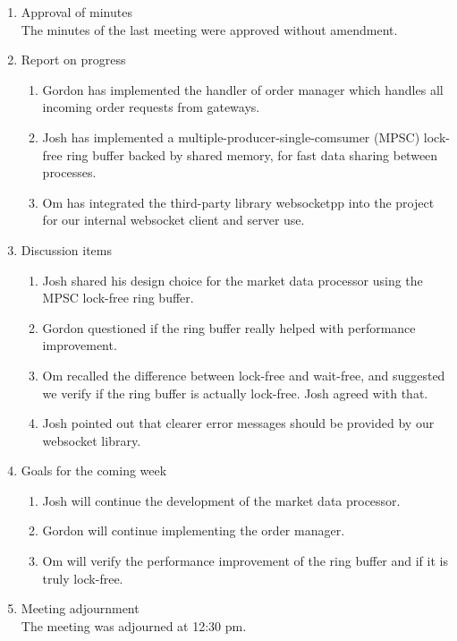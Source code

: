 \documentclass[12pt,a4paper]{article}
\begin{document}
\begin{enumerate}
\item Approval of minutes\\
The minutes of the last meeting were approved without amendment.\\
\item Report on progress
\begin{enumerate}
\item Gordon has implemented the handler of order manager which handles all incoming order requests from gateways.\\
\item Josh has implemented a multiple-producer-single-comsumer (MPSC) lock-free ring buffer backed by shared memory, for fast data sharing between processes.\\
\item Om has integrated the third-party library websocketpp into the project for our internal websocket client and server use.\\
\end{enumerate}
\item Discussion items
\begin{enumerate}
\item Josh shared his design choice for the market data processor using the MPSC lock-free ring buffer.\\
\item Gordon questioned if the ring buffer really helped with performance improvement.\\
\item Om recalled the difference between lock-free and wait-free, and suggested we verify if the ring buffer is actually lock-free. Josh agreed with that.\\
\item Josh pointed out that clearer error messages should be provided by our websocket library.\\
\end{enumerate}
\item Goals for the coming week
\begin{enumerate}
\item Josh will continue the development of the market data processor.\\
\item Gordon will continue implementing the order manager.\\
\item Om will verify the performance improvement of the ring buffer and if it is truly lock-free.\\
\end{enumerate}
\item Meeting adjournment\\
The meeting was adjourned at 12:30 pm.
\end{enumerate}
\end{document}
